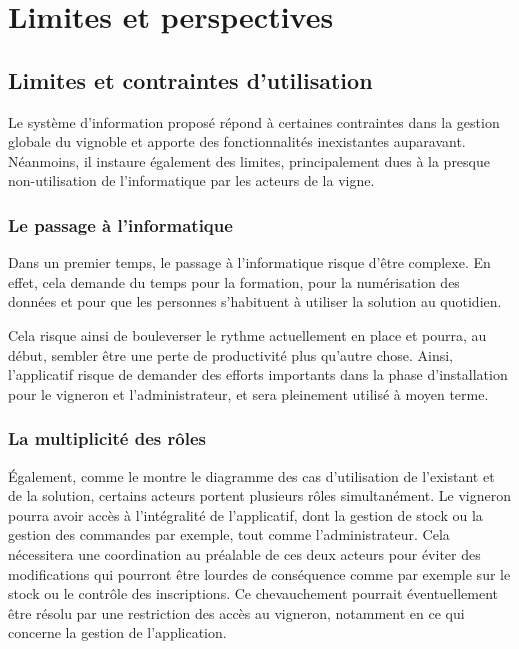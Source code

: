 \documentclass[a4paper, titlepage]{report}
\begin{document}
\chapter{Limites et perspectives}

\section{Limites et contraintes d'utilisation}

Le système d'information proposé répond à certaines contraintes dans la
gestion globale du vignoble et apporte des fonctionnalités inexistantes
auparavant. Néanmoins, il instaure également des limites, principalement
dues à la presque non-utilisation de l'informatique par les acteurs de
la vigne.

\subsection{Le passage à l'informatique}

Dans un premier temps, le passage à l'informatique risque d'être
complexe. En effet, cela demande du temps pour la formation, pour la
numérisation des données et pour que les personnes s'habituent à
utiliser la solution au quotidien.

Cela risque ainsi de bouleverser le rythme actuellement en place et
pourra, au début, sembler être une perte de productivité plus qu'autre
chose. Ainsi, l'applicatif risque de demander des efforts importants
dans la phase d'installation pour le vigneron et l'administrateur, et
sera pleinement utilisé à moyen terme.

\subsection{La multiplicité des rôles}

Également, comme le montre le diagramme des cas d'utilisation de
l'existant et de la solution, certains acteurs
portent plusieurs rôles simultanément. Le vigneron pourra avoir accès à
l'intégralité de l'applicatif, dont la gestion de stock ou la gestion
des commandes par exemple, tout comme l'administrateur. Cela nécessitera
une coordination au préalable de ces deux acteurs pour éviter des
modifications qui pourront être lourdes de conséquence comme par exemple
sur le stock ou le contrôle des inscriptions. Ce chevauchement pourrait
éventuellement être résolu par une restriction des accès au vigneron,
notamment en ce qui concerne la gestion de l'application.
\end{document}
